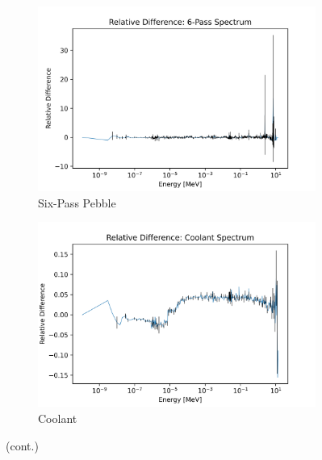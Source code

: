 \begin{figure}[H]\ContinuedFloat
\centering

\begin{subfigure}{0.95\textwidth}
  \includegraphics[width=0.95\linewidth]{figures/reldiff_six_spec_er}
  \caption{Six-Pass Pebble}
  \label{fig:diff-six}
\end{subfigure}%


\begin{subfigure}{0.95\textwidth}
  \includegraphics[width=0.95\linewidth]{figures/reldiff_cool_spec_er}
  \caption{Coolant}
  \label{fig:diff-cool}
\end{subfigure}%

\caption[]{(cont.)}
\end{figure}

